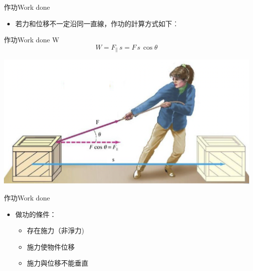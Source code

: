 \documentclass[beamer=true]{standalone}
\begin{document}
\begin{frame}{作功Work done}
    \begin{itemize}
        \item 若力和位移不一定沿同一直線，作功的計算方式如下︰
    \end{itemize}
    \begin{alertblock}
        {作功Work done W}
        \begin{equation}
            W=F_\parallel \, s= F\, s\, \cos \theta
        \end{equation}
    \end{alertblock}
    {\par\centering
    \includegraphics[width=.65\textwidth]{assets/af6c9fc3.png}
    \par}
\end{frame}
\begin{frame}{作功Work done}
    \begin{itemize}
        \item 做功的條件：
              \begin{itemize}
                  \item 存在施力（非淨力)
                  \item 施力使物件位移
                  \item 施力與位移不能垂直
              \end{itemize}
    \end{itemize}

\end{frame}

\end{document}
